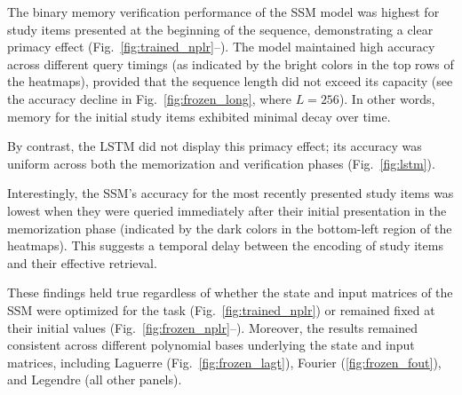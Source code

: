 \documentclass[10pt,letterpaper]{article}
\begin{document}
The binary memory verification performance of the SSM model was highest for study items presented at the beginning of the sequence, demonstrating a clear primacy effect (Fig.~\ref{fig:trained_nplr}--).
The model maintained high accuracy across different query timings (as indicated by the bright colors in the top rows of the heatmaps), provided that the sequence length did not exceed its capacity (see the accuracy decline in Fig.~\ref{fig:frozen_long}, where $L=256$).
In other words, memory for the initial study items exhibited minimal decay over time.

By contrast, the LSTM did not display this primacy effect; its accuracy was uniform across both the memorization and verification phases (Fig.~\ref{fig:lstm}).

Interestingly, the SSM's accuracy for the most recently presented study items was lowest when they were queried immediately after their initial presentation in the memorization phase (indicated by the dark colors in the bottom-left region of the heatmaps).
This suggests a temporal delay between the encoding of study items and their effective retrieval.

These findings held true regardless of whether the state and input matrices of the SSM were optimized for the task (Fig.~\ref{fig:trained_nplr}) or remained fixed at their initial values (Fig.~\ref{fig:frozen_nplr}--).
Moreover, the results remained consistent across different polynomial bases underlying the state and input matrices, including Laguerre (Fig.~\ref{fig:frozen_lagt}), Fourier (\ref{fig:frozen_fout}), and Legendre (all other panels).

\end{document}
